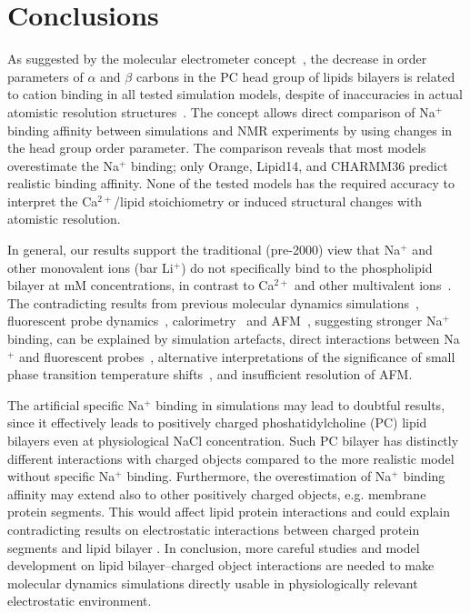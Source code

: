 \documentclass[pre,aps,floatfix,authordate1-4,twocolumn]{revtex4-1}
\begin{document}
\section{Conclusions}
As suggested by the molecular electrometer concept~\cite{akutsu81,altenbach84,seelig87,scherer89},
the decrease in order parameters of $\alpha$ and $\beta$ carbons in the PC head group of lipids bilayers
is related to cation binding  in all tested simulation models, despite of inaccuracies 
in actual atomistic resolution structures~\cite{botan15}. The concept allows direct comparison
of Na$^+$ binding affinity between simulations and NMR experiments by using changes in the head group order parameter.
The comparison reveals that most models overestimate the Na$^+$ binding; only Orange, Lipid14, and CHARMM36 
predict realistic binding affinity. None of the tested models has the required accuracy to interpret
the Ca$^{2+}$/lipid stoichiometry or induced structural changes with atomistic resolution.

In general, our results support the traditional (pre-2000) view that Na$^+$ and other monovalent ions (bar Li$^+$)
do not specifically bind to the phospholipid bilayer at mM concentrations, in contrast to Ca$^{2+}$ and other multivalent 
ions~\cite{eisenberg79,akutsu81,altenbach84,tatulian87,clarke99,binder02,pabst07,filippov09}.
The contradicting results from previous molecular dynamics simulations~\cite{bockmann03,bockmann04}, 
fluorescent probe dynamics~\cite{bockmann03,vacha09a,harb13}, 
calorimetry~\cite{bockmann03,klasczyk10} and AFM~\cite{manyes05,manyes06,fukuma07,ferber11,morata12}, 
suggesting stronger Na$^+$ binding, can be explained by simulation artefacts, 
direct interactions between Na$^+$ and fluorescent probes~\cite{filippov09}, 
alternative interpretations of the significance of small phase transition temperature shifts~\cite{cevc90}, 
and insufficient resolution of AFM.

The artificial specific Na$^+$ binding in simulations may lead to doubtful results, since it effectively leads  to
positively charged phoshatidylcholine (PC) lipid bilayers even at physiological NaCl concentration.
Such PC bilayer has distinctly different interactions with charged objects compared to the more realistic
model without specific Na$^+$ binding. Furthermore, the overestimation of Na$^+$ binding affinity may
extend also to other positively charged objects, e.g. membrane protein segments. This would affect
lipid protein interactions and could explain contradicting results on electrostatic interactions 
between charged protein segments and lipid bilayer \cite{arkhipov13,kaszuba15}. In conclusion, 
more careful studies and model development on lipid bilayer--charged object interactions are
needed to make molecular dynamics simulations directly usable in physiologically relevant
electrostatic environment. 
\end{document}
